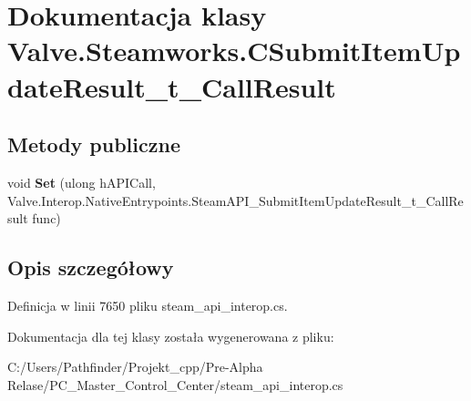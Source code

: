 \hypertarget{class_valve_1_1_steamworks_1_1_c_submit_item_update_result__t___call_result}{}\section{Dokumentacja klasy Valve.\+Steamworks.\+C\+Submit\+Item\+Update\+Result\+\_\+t\+\_\+\+Call\+Result}
\label{class_valve_1_1_steamworks_1_1_c_submit_item_update_result__t___call_result}
\subsection*{Metody publiczne}
\begin{DoxyCompactItemize}
\item 
\mbox{\label{class_valve_1_1_steamworks_1_1_c_submit_item_update_result__t___call_result_a94bbc121a3d712e37d28f9fa2e15c212}} 
void {\bfseries Set} (ulong h\+A\+P\+I\+Call, Valve.\+Interop.\+Native\+Entrypoints.\+Steam\+A\+P\+I\+\_\+\+Submit\+Item\+Update\+Result\+\_\+t\+\_\+\+Call\+Result func)
\end{DoxyCompactItemize}


\subsection{Opis szczegółowy}


Definicja w linii 7650 pliku steam\+\_\+api\+\_\+interop.\+cs.



Dokumentacja dla tej klasy została wygenerowana z pliku\+:\begin{DoxyCompactItemize}
\item 
C\+:/\+Users/\+Pathfinder/\+Projekt\+\_\+cpp/\+Pre-\/\+Alpha Relase/\+P\+C\+\_\+\+Master\+\_\+\+Control\+\_\+\+Center/steam\+\_\+api\+\_\+interop.\+cs\end{DoxyCompactItemize}

